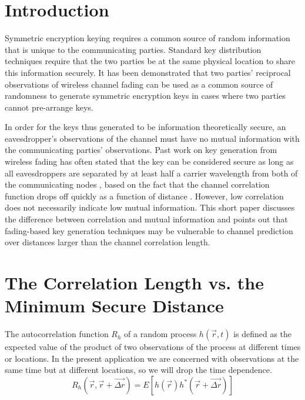\documentclass[conference]{ieeetran}
\begin{document}
\section{Introduction}
Symmetric encryption keying requires a common source of random information that is unique to the communicating parties. Standard key distribution techniques require that the two parties be at the same physical location to share this information securely.  
It has been demonstrated \cite{azimisadjadi2007, bloch2008, mathur2008, ye2010} that two parties' reciprocal observations of wireless channel fading can be used as a common source of randomness to generate symmetric encryption keys in cases where two parties cannot pre-arrange keys.  

In order for the keys thus generated to be information theoretically secure, an eavesdropper's observations of the channel must have no mutual information with the communicating parties' observations.  Past work on key generation from wireless fading has often stated that the key can be considered secure as long as all eavesdroppers are separated by at least half a carrier wavelength from both of the communicating nodes \cite{azimisadjadi2007, bloch2008, mathur2008, ye2010}, based on the fact that the channel correlation function drops off quickly as a function of distance \cite{jakes1974}.  However, low correlation does not necessarily indicate low mutual information.  This short paper discusses the difference between correlation and mutual information and points out that fading-based key generation techniques may be vulnerable to channel prediction \cite{duel-hallen2000, svantesson2003} over distances larger than the channel correlation length.

\section{The Correlation Length vs. the Minimum Secure Distance}
The autocorrelation function $R_h$ of a random process $h(\vec{r},t)$ is defined as the expected value of the product of two observations of the process at different times or locations.  In the present application we are concerned with observations at the same time but at different locations, so we will drop the time dependence.
\begin{equation}\label{ensemblecorr}
R_h(\vec{r},\vec{r}+\vec{\Delta r}) = E[h(\vec{r})h^*(\vec{r}+\vec{\Delta r})]
\end{equation}
\end{document}
